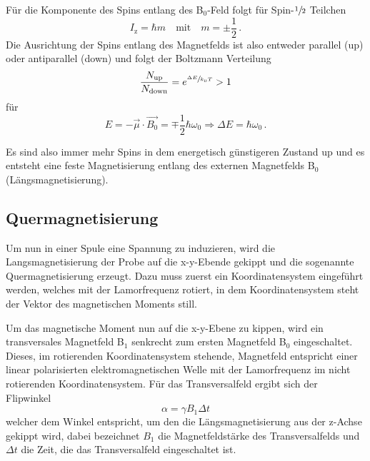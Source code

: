 Für die Komponente des Spins entlang des B$_{0}$-Feld folgt für Spin-$\sfrac{1}{2}$ Teilchen
\begin{equation*}
  I_\text{z} = \hbar m \quad \text{mit} \quad m = \pm\frac{1}{2} \, .
\end{equation*}
Die Ausrichtung der Spins entlang des Magnetfelds ist also entweder parallel (up) oder antiparallel (down) und
folgt der Boltzmann Verteilung
\begin{equation*}
  \frac{N_\text{up}}{N_\text{down}} = e^{\sfrac{\Delta E}{k_\text{B} T}} > 1
\end{equation*}
für
\begin{equation*}
  E = - \vec{\mu} \cdot \vec{B_0} = \mp \frac{1}{2} \hbar \omega_0 \Rightarrow \Delta E = \hbar \omega_0 \, .
\end{equation*}

Es sind also immer mehr Spins in dem energetisch günstigeren Zustand up und es entsteht eine feste Magnetisierung entlang des externen Magnetfelds B$_0$ (Längsmagnetisierung).


\subsection{Quermagnetisierung}

Um nun in einer Spule eine Spannung zu induzieren, wird die Langsmagnetisierung der Probe auf die x-y-Ebende gekippt und die sogenannte Quermagnetisierung erzeugt.
Dazu muss zuerst ein Koordinatensystem eingeführt werden, welches mit der Lamorfrequenz rotiert, in dem Koordinatensystem steht der Vektor des magnetischen Moments still.

Um das magnetische Moment nun auf die x-y-Ebene zu kippen, wird ein transversales Magnetfeld B$_1$ senkrecht zum ersten Magnetfeld B$_0$ eingeschaltet. Dieses, im rotierenden Koordinatensystem stehende, Magnetfeld entspricht einer linear polarisierten elektromagnetischen Welle mit der Lamorfrequenz im nicht rotierenden Koordinatensystem.
Für das Transversalfeld ergibt sich der Flipwinkel
\begin{equation*}
  \alpha = \gamma B_1 \Delta t
\end{equation*}
welcher dem Winkel entspricht, um den die Längsmagnetisierung aus der z-Achse gekippt wird, dabei bezeichnet $B_1$ die Magnetfeldstärke des Transversalfelds und $\Delta t$ die Zeit, die das Transversalfeld eingeschaltet ist.

